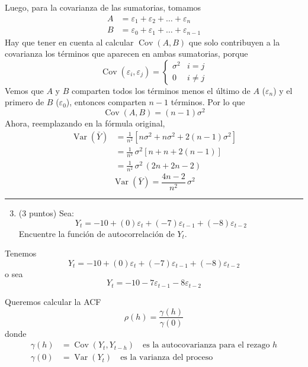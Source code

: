 \documentclass[9pt]{extarticle}
\begin{document}
Luego, para la covarianza de las sumatorias, tomamos
\begin{align*}
A &= \varepsilon_1 + \varepsilon_2 + \dots + \varepsilon_n\\
B &= \varepsilon_0 + \varepsilon_1 + \dots + \varepsilon_{n-1}
\end{align*}
Hay que tener en cuenta al calcular $\operatorname{Cov}(A,B)$ que solo contribuyen a la covarianza los términos que aparecen en ambas sumatorias, porque
\[
\operatorname{Cov}(\varepsilon_i,\varepsilon_j) =
\begin{cases}
\sigma^2 & i = j\\
0 & i \neq j
\end{cases}
\]
Vemos que $A$ y $B$ comparten todos los términos menos el último de $A$ ($\varepsilon_n$) y el primero de $B$ ($\varepsilon_0$), entonces comparten $n-1$ términos. Por lo que
\[
\boxed{\operatorname{Cov}(A,B) = (n-1)\sigma^2}
\]
Ahora, reemplazando en la fórmula original,
\begin{align*}
\operatorname{Var}(\bar{Y}) &= \frac{1}{n^2}\left[n\sigma^2 + n\sigma^2 + 2(n-1)\sigma^2\right]\\
&= \frac{1}{n^2}\,\sigma^2\left[n + n + 2(n-1)\right]\\
&= \frac{1}{n^2}\,\sigma^2\,(2n + 2n - 2)
\end{align*}
\[
\boxed{\operatorname{Var}(\bar{Y}) = \frac{4n-2}{n^2}\,\sigma^2}
\]

\bigskip
\hrule
\bigskip
\begin{enumerate}\setcounter{enumi}{2}
\item (3 puntos) Sea:
\[ Y_t = -10 + (0)\varepsilon_t + (-7)\varepsilon_{t-1} + (-8)\varepsilon_{t-2} \]
Encuentre la función de autocorrelación de $Y_t$.
\end{enumerate}

\hrulefill

Tenemos
\[
Y_t = -10 + (0)\varepsilon_t + (-7)\varepsilon_{t-1} + (-8)\varepsilon_{t-2}
\]
o sea
\[
Y_t = -10 - 7\varepsilon_{t-1} - 8\varepsilon_{t-2}
\]

Queremos calcular la ACF
\[
\rho(h) = \frac{\gamma(h)}{\gamma(0)}
\]
donde
\begin{align*}
\gamma(h) &= \operatorname{Cov}(Y_t, Y_{t-h}) \quad \text{es la autocovarianza para el rezago } h\\
\gamma(0) &= \operatorname{Var}(Y_t) \quad \text{es la varianza del proceso}
\end{align*}
\end{document}
